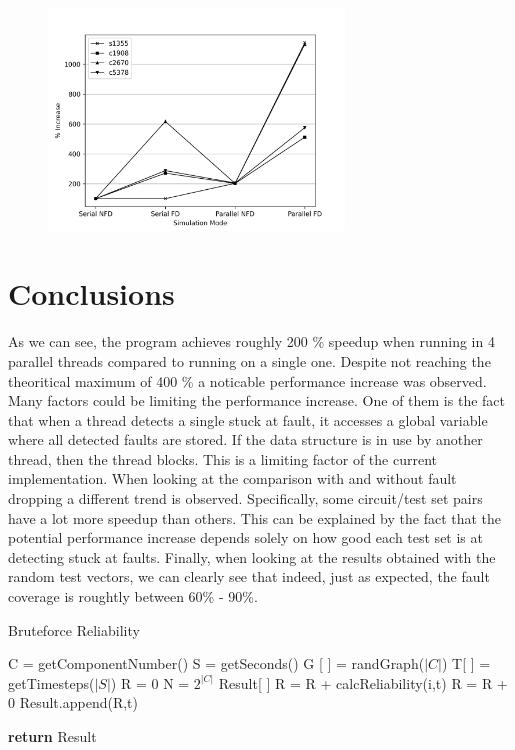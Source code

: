 \documentclass[a4paper,12pt]{article}
\begin{document}
\begin{figure}[h]  
  \centering
    \includegraphics[width=0.7\textwidth]{figure3.png}
\end{figure}

\clearpage
\section*{Conclusions}
As we can see, the program achieves roughly 200 \% speedup when running in 4 parallel threads compared to running on a single one. Despite not reaching the theoritical maximum of 400 \% a noticable performance increase was observed. Many factors could be limiting the performance increase. One of them is the fact that when a thread detects a single stuck at fault, it accesses a global variable where all detected faults are stored. If the data structure is in use by another thread, then the thread blocks. This is a limiting factor of the current implementation. When looking at the comparison with and without fault dropping a different trend is observed. Specifically, some circuit/test set pairs have a lot more speedup than others. This can be explained by the fact that the potential performance increase depends solely on how good each test set is at detecting stuck at faults. Finally, when looking at the results obtained with the random test vectors, we can clearly see that indeed, just as expected, the fault coverage is roughtly between 60\% - 90\%.

\iffalse
\begin{algorithm}
	\caption{Bruteforce Reliability} 
	\begin{algorithmic}[1]
		\State C = getComponentNumber()
		\State S = getSeconds()
		\State G [ ] = randGraph($|C|$)
		\State T[ ] = getTimesteps($|S|$)
		\State R = 0
		\State N = $2^{|C|}$
		\State Result[ ]
					\State R = R + calcReliability(i,t)
				\Else
					\State R = R + 0
				\EndIf	
			\EndFor
		\State Result.append(R,t)
		\EndFor
		
		\State \textbf{return} Result
	\end{algorithmic} 
\end{algorithm}
\end{document}
